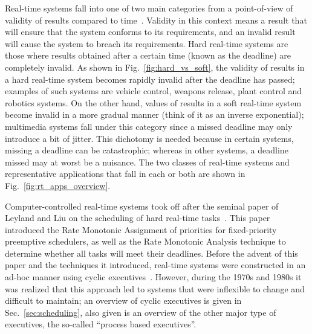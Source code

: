 Real-time systems fall into one of two main categories from a
point-of-view of validity of results compared to
time~\cite{jensen@ccej97}. Validity in this context means a result
that will ensure that the system conforms to its requirements, and an
invalid result will cause the system to breach its requirements. Hard
real-time systems are those where results obtained after a certain
time (known as the deadline) are completely invalid. As shown in
Fig.~\ref{fig:hard_vs_soft}, the validity of results in a hard
real-time system becomes rapidly invalid after the deadline has
passed; examples of such systems are vehicle control, weapons release,
plant control and robotics systems. On the other hand, values of
results in a soft real-time system become invalid in a more gradual
manner (think of it as an inverse exponential); multimedia systems
fall under this category since a missed deadline may only introduce a
bit of jitter. This dichotomy is needed because in certain
systems, missing a deadline can be catastrophic; whereas in other
systems, a deadline missed may at worst be a nuisance. The two classes
of real-time systems and representative applications that fall in each
or both are shown in Fig.~\ref{fig:rt_apps_overview}.

Computer-controlled real-time systems took off after the seminal paper
of Leyland and Liu on the scheduling of hard real-time
tasks~\cite{liu@jacm73}. This paper introduced the Rate Monotonic
Assignment of priorities for fixed-priority preemptive schedulers, as
well as the Rate Monotonic Analysis technique to determine whether all
tasks will meet their deadlines. Before the advent of this paper and
the techniques it introduced, real-time systems were constructed in an
ad-hoc manner using cyclic executives~\cite{audsley@rts95,
  laplante@rts95}. However, during the 1970s and 1980s it was realized
that this approach led to systems that were inflexible to change and
difficult to maintain; an overview of cyclic executives is given in
Sec.~\ref{sec:scheduling}, also given is an overview of the other
major type of executives, the so-called ``process based executives''.

